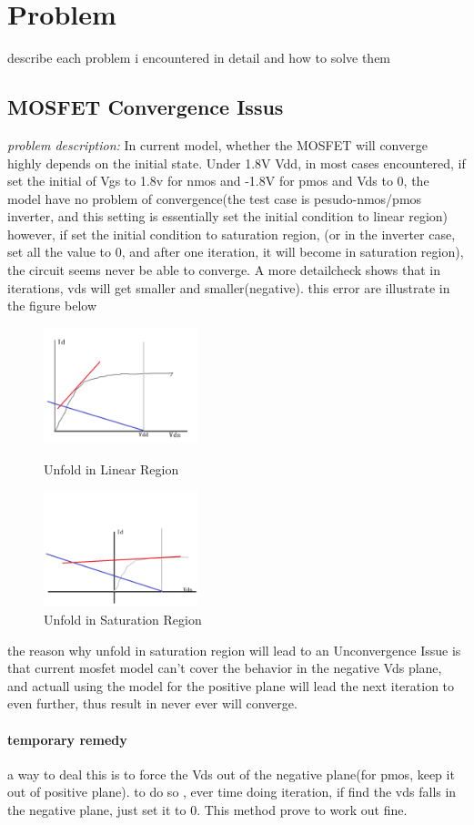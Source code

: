 \chapter{Problem}
describe each problem i encountered in detail and how to solve them

\section{MOSFET Convergence Issus}
\emph{problem description:}
\newline
In current model, whether the MOSFET will converge highly depends on the initial state. Under 1.8V Vdd, in most cases encountered, if set the initial of Vgs to 1.8v for nmos and -1.8V for pmos and Vds to 0, the model have no problem of convergence(the test case is pesudo-nmos/pmos inverter, and this setting is essentially set the initial condition to linear region)
\newline
however, if set the initial condition to saturation region, (or in the inverter case, set all the value to 0, and after one iteration, it will become in saturation region), the circuit seems never be able to converge. A more detailcheck shows that in iterations, vds will get smaller and smaller(negative). this error are illustrate in the figure below
\begin{figure}[t!]
\centering
\begin{minipage}[t]{0.5\textwidth}
	\centering
	\includegraphics[width=0.4\textwidth]{../figures/mos_converge_normal.png}
	\caption{Unfold in Linear Region}
\end{minipage}
\begin{minipage}[t]{0.5\textwidth}
	\centering
	\includegraphics[width=0.4\textwidth]{../figures/mos_converge_abnormal.png}
	\caption{Unfold in Saturation Region}
\end{minipage}
\end{figure}
 the reason why unfold in saturation region will lead to an Unconvergence Issue is that current mosfet model can't cover the behavior in the negative Vds plane, and actuall using the model for the positive plane will lead the next iteration to even further, thus result in never ever will converge.
 \subsubsection{temporary remedy}
 a way to deal this is to force the Vds out of the negative plane(for pmos, keep it out of positive plane). to do so , ever time doing iteration, if find the vds falls in the negative plane, just set it to 0. This method prove to work out fine.
